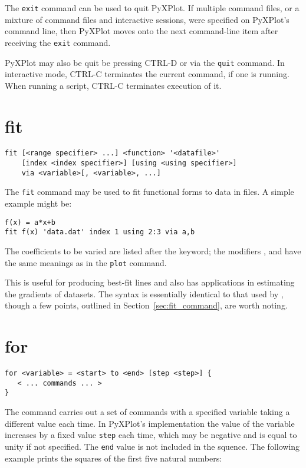 The {\tt exit} command can be used to quit PyXPlot. If multiple command files,
or a mixture of command files and interactive sessions, were specified on
PyXPlot's command line, then PyXPlot moves onto the next command-line item
after receiving the {\tt exit} command.

PyXPlot may also be quit be pressing CTRL-D or via the {\tt quit} command. In
interactive mode, CTRL-C terminates the current command, if one is running.
When running a script, CTRL-C terminates execution of it.


\section{fit}

\begin{verbatim}
fit [<range specifier> ...] <function> '<datafile>'
    [index <index specifier>] [using <using specifier>]
    via <variable>[, <variable>, ...]
\end{verbatim}

The {\tt fit} command may be used to fit functional forms to data in
files. A simple example might be:

\begin{verbatim}
f(x) = a*x+b
fit f(x) 'data.dat' index 1 using 2:3 via a,b
\end{verbatim}

\noindent The coefficients to be varied are listed after the 
 keyword; the modifiers ,  and
 have the same meanings as in the {\tt plot} command.

This is useful for producing best-fit lines and also has applications in
estimating the gradients of datasets.  The syntax is essentially identical to
that used by \gnuplot, though a few points, outlined in
Section~\ref{sec:fit_command}, are worth noting.

\section{for}

\begin{verbatim}
for <variable> = <start> to <end> [step <step>] {
   < ... commands ... >
}
\end{verbatim}

The  command carries out a set of commands with a specified
variable taking a different value each time.  In PyXPlot's implementation the
value of the variable increases by a fixed value {\tt step} each time, which may
be negative and is equal to unity if not specified.  The {\tt end} value is not
included in the squence.  The following example prints the squares of the first
five natural numbers:

